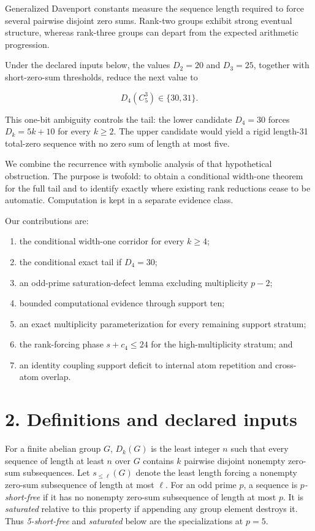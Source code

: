 \documentclass[
  11pt,
]{article}
\providecommand{\tightlist}{%
  \setlength{\itemsep}{0pt}\setlength{\parskip}{0pt}}
\begin{document}
Generalized Davenport constants measure the sequence length required to
force several pairwise disjoint zero sums. Rank-two groups exhibit
strong eventual structure, whereas rank-three groups can depart from the
expected arithmetic progression.

Under the declared inputs below, the values \(D_2=20\) and \(D_3=25\),
together with short-zero-sum thresholds, reduce the next value to

\[
D_4(C_5^3)\in\{30,31\}.
\]

This one-bit ambiguity controls the tail: the lower candidate \(D_4=30\)
forces \(D_k=5k+10\) for every \(k\ge2\). The upper candidate would
yield a rigid length-31 total-zero sequence with no zero sum of length
at most five.

We combine the recurrence with symbolic analysis of that hypothetical
obstruction. The purpose is twofold: to obtain a conditional width-one
theorem for the full tail and to identify exactly where existing rank
reductions cease to be automatic. Computation is kept in a separate
evidence class.

Our contributions are:

\begin{enumerate}
\def\labelenumi{\arabic{enumi}.}
\tightlist
\item
  the conditional width-one corridor for every \(k\ge4\);
\item
  the conditional exact tail if \(D_4=30\);
\item
  an odd-prime saturation-defect lemma excluding multiplicity \(p-2\);
\item
  bounded computational evidence through support ten;
\item
  an exact multiplicity parameterization for every remaining support
  stratum;
\item
  the rank-forcing phase \(s+c_4\le24\) for the high-multiplicity
  stratum; and
\item
  an identity coupling support deficit to internal atom repetition and
  cross-atom overlap.
\end{enumerate}

\hypertarget{definitions-and-declared-inputs}{%
\section{2. Definitions and declared
inputs}\label{definitions-and-declared-inputs}}

For a finite abelian group \(G\), \(D_k(G)\) is the least integer \(n\)
such that every sequence of length at least \(n\) over \(G\) contains
\(k\) pairwise disjoint nonempty zero-sum subsequences. Let
\(s_{\le\ell}(G)\) denote the least length forcing a nonempty zero-sum
subsequence of length at most \(\ell\). For an odd prime \(p\), a
sequence is \emph{\(p\)-short-free} if it has no nonempty zero-sum
subsequence of length at most \(p\). It is \emph{saturated} relative to
this property if appending any group element destroys it. Thus
\emph{5-short-free} and \emph{saturated} below are the specializations
at \(p=5\).
\end{document}
